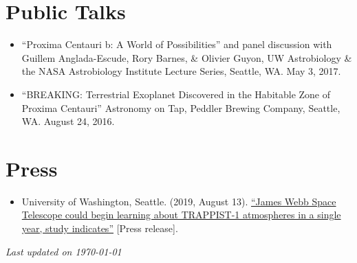 \documentclass[margin,10pt]{res}
\begin{document}
\begin{resume}
 \section{Public Talks}
                \begin{itemize}  
                    \item ``Proxima Centauri b: A World of Possibilities'' and panel discussion with Guillem Anglada-Escude, Rory Barnes, \& Olivier Guyon, UW Astrobiology \& the NASA Astrobiology Institute Lecture Series, Seattle, WA. May 3, 2017.
                    \item ``BREAKING: Terrestrial Exoplanet Discovered in the Habitable Zone of Proxima Centauri'' Astronomy on Tap, Peddler Brewing Company, Seattle, WA. August 24, 2016.\\
                 \end{itemize}
                 
\section{Press}
                \begin{itemize}  
                    \item University of Washington, Seattle. (2019, August 13). \href{https://www.washington.edu/news/2019/08/13/james-webb-space-telescope-could-begin-learning-about-trappist-1-atmospheres-in-a-single-year-study-indicates/}{``James Webb Space Telescope could begin learning about TRAPPIST-1 atmospheres in a single year, study indicates''} [Press release]. 
                 \end{itemize}

\hfill \textit{Last updated on \today}

\end{resume}
\end{document}
